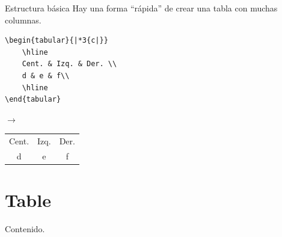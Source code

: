 \documentclass[dvipsnames,xcolor, handout]{beamer}
\theoremstyle{plain}
\theoremstyle{definition}
\begin{document}
\begin{frame}[fragile]{Estructura básica}
Hay una forma ``rápida'' de crear una tabla con muchas columnas.

\begin{minipage}{0.57\linewidth}
\begin{verbatim}
\begin{tabular}{|*3{c|}}
    \hline
    Cent. & Izq. & Der. \\
    d & e & f\\
    \hline
\end{tabular}
\end{verbatim}
\end{minipage}
\begin{minipage}{0.1\linewidth}
    $\rightarrow$
\end{minipage}
\begin{minipage}{0.3\linewidth}
    \begin{tabular}[b]{|*3{c|}}
    \hline
    Cent. & Izq. & Der. \\
    d & e & f\\
    \hline
\end{tabular}
\end{minipage}
    
\end{frame}

\section{Table}
\begin{frame}{Contenido.}
\begin{multicols}{2}
  \tableofcontents[currentsection]
\end{multicols}
\end{frame}
\end{document}
